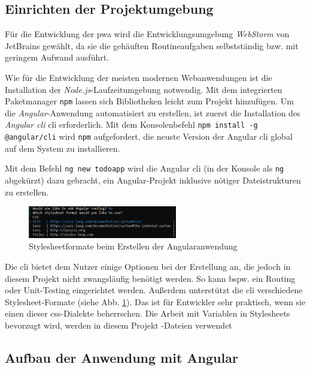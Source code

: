 \subsection{Einrichten der Projektumgebung}
Für die Entwicklung der \ac{pwa} wird die Entwicklungsumgebung \textit{WebStorm} von JetBrains gewählt, da sie die gehäuften Routineaufgaben selbstständig bzw. mit geringem Aufwand ausführt.

Wie für die Entwicklung der meisten modernen Webanwendungen ist die Installation der \textit{Node.js}-Laufzeitumgebung notwendig. Mit dem integrierten Paketmanager \texttt{npm} lassen sich Bibliotheken leicht zum Projekt hinzufügen.
Um die \textit{Angular}-Anwendung automatisiert zu erstellen, ist zuerst die Installation des \textit{Angular \acl{cli}} \acs{cli} erforderlich. Mit dem Konsolenbefehl \texttt{npm install -g @angular/cli} wird \texttt{npm} aufgefordert, die neuste Version der Angular \ac{cli} global auf dem System zu installieren.

Mit dem Befehl \texttt{ng new todoapp} wird die Angular \ac{cli} (in der Konsole als \texttt{ng} abgekürzt) dazu gebracht, ein Angular-Projekt inklusive nötiger Dateistrukturen zu erstellen.

\begin{figure}[h!]
	\centering
	\includegraphics[width=0.58\textwidth]{img/angular_cli_css.PNG}
	\caption{Stylesheetformate beim Erstellen der Angularanwendung}
	\label{fig:stylesheet_formate_cli}
\end{figure}

Die \ac{cli} bietet dem Nutzer einige Optionen bei der Erstellung an, die jedoch in diesem Projekt nicht zwangsläufig benötigt werden. So kann bspw. ein Routing oder Unit-Testing eingerichtet werden.
Außerdem unterstützt die \ac{cli} verschiedene Stylesheet-Formate (siehe Abb. \ref{fig:stylesheet_formate_cli}). Das ist für Entwickler sehr praktisch, wenn sie einen dieser \ac{css}-Dialekte beherrschen. Die Arbeit mit Variablen in Stylesheets bevorzugt wird, werden in diesem Projekt -Dateien verwendet

\subsection{Aufbau der Anwendung mit Angular}

